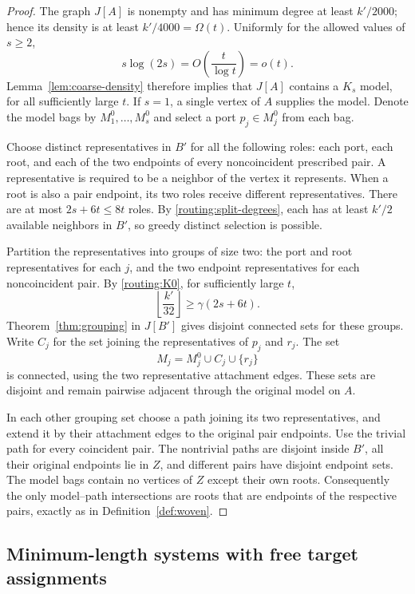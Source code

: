 \begin{proof}
The graph $J[A]$ is nonempty and has minimum degree at least $k'/2000$;
hence its density is at least $k'/4000=\Omega(t)$.  Uniformly for the
allowed values of $s\ge2$,
\[
 s\log(2s)=O\!\left(\frac{t}{\log t}\right)=o(t).
\]
Lemma~\ref{lem:coarse-density} therefore implies that $J[A]$ contains
a $K_s$ model, for all sufficiently large $t$.  If $s=1$, a single
vertex of $A$ supplies the model.  Denote the model bags by
$M_1^0,\ldots,M_s^0$ and select a port $p_j\in M_j^0$ from each bag.

Choose distinct representatives in $B'$ for all the following roles:
each port, each root, and each of the two endpoints of every
noncoincident prescribed pair.  A representative is required to be a
neighbor of the vertex it represents.  When a root is also a pair
endpoint, its two roles receive different representatives.  There are
at most $2s+6t\le8t$ roles.  By \eqref{routing:split-degrees}, each has
at least $k'/2$ available neighbors in $B'$, so greedy distinct selection
is possible.

Partition the representatives into groups of size two: the port and
root representatives for each $j$, and the two endpoint representatives
for each noncoincident pair.  By \eqref{routing:K0}, for sufficiently
large $t$,
\[
 \left\lfloor\frac{k'}{32}\right\rfloor\ge \gamma(2s+6t).
\]
Theorem~\ref{thm:grouping} in $J[B']$ gives disjoint connected sets for
these groups.  Write $C_j$ for the set joining the representatives of
$p_j$ and $r_j$.  The set
\[
 M_j=M_j^0\cup C_j\cup\{r_j\}
\]
is connected, using the two representative attachment edges.  These
sets are disjoint and remain pairwise adjacent through the original
model on $A$.

In each other grouping set choose a path joining its two representatives,
and extend it by their attachment edges to the original pair endpoints.
Use the trivial path for every coincident pair.  The nontrivial paths
are disjoint inside $B'$, all their original endpoints lie in $Z$, and
different pairs have disjoint endpoint sets.  The model bags contain
no vertices of $Z$ except their own roots.  Consequently the only
model--path intersections are roots that are endpoints of the respective
pairs, exactly as in Definition~\ref{def:woven}.
\end{proof}

\subsection{Minimum-length systems with free target assignments}

